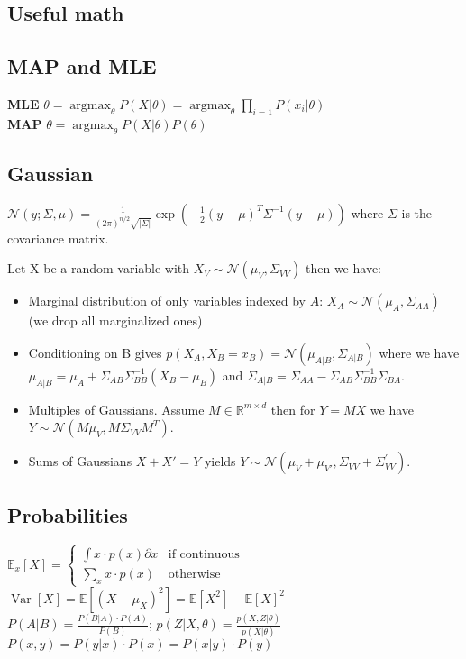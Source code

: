 \documentclass[11pt]{article}
\newcommand{\gauss}{\mathcal{N}}
\newcommand{\argmax}{\operatorname{argmax}}
\begin{document}
\begin{multicols*}{3}
\section*{Useful math}
\subsection*{MAP and MLE}
\textbf{MLE} $\theta = \argmax_\theta P(X|\theta) = \argmax_\theta \prod_{i=1} P(x_i|\theta)$\\
\textbf{MAP} $\theta = \argmax_\theta P(X|\theta) P(\theta)$


\subsection*{Gaussian}
$\gauss(y;\Sigma,\mu) = \frac{1}{(2\pi)^{n/2} \sqrt{|\Sigma|}} \exp \left( - \frac{1}{2} (y-\mu)^T \Sigma^{-1}(y-\mu) \right) $ where $\Sigma$ is the covariance matrix.

Let X be a random variable with $X_V \sim \gauss(\mu_V,\Sigma_{VV})$ then we have:
\begin{itemize}
	\item Marginal distribution of only variables indexed by $A$: $X_A \sim \gauss(\mu_A,\Sigma_{AA})$ (we drop all marginalized ones)
	\item Conditioning on B gives $p(X_A,X_B = x_B) = \gauss(\mu_{A|B},\Sigma_{A|B})$ where we have $\mu_{A|B} = \mu_A + \Sigma_{AB}\Sigma_{BB}^{-1}(X_B - \mu_B)$ and $\Sigma_{A|B} = \Sigma_{AA} - \Sigma_{AB}\Sigma_{BB}^{-1}\Sigma_{BA}$.
	\item Multiples of Gaussians. Assume $M\in \mathbb{R}^{m\times d}$ then for $Y=MX$ we have $Y\sim \gauss (M\mu_V,M\Sigma_{VV}M^T)$.
	\item Sums of Gaussians $X+X'=Y$ yields $Y\sim \gauss (\mu_V + \mu_{V'} ,\Sigma_{VV} + \Sigma^{'}_{VV})$.
\end{itemize}


\subsection*{Probabilities}
$\mathbb{E}_x[X] = \begin{cases}
	\int x \cdot p(x) \partial x  & \text{if continuous}\\
	\sum_x x \cdot p(x) & \text{otherwise}
\end{cases}$\\
$\operatorname{Var}[X] = \mathbb{E}[(X-\mu_X)^2] = \mathbb{E}[X^2] - \mathbb{E}[X]^2$\\
$P(A|B) = \frac{P(B|A) \cdot P(A)}{P(B)}$; $p(Z|X,\theta) = \frac{p(X,Z|\theta)}{p(X|\theta)}$\\
$P(x,y) = P(y|x) \cdot  P(x) = P(x|y) \cdot P(y)$


\end{multicols*}
\end{document}
